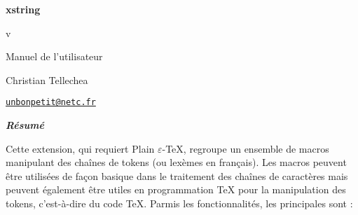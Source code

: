 \documentclass[a4paper,10pt,french]{article}
\newcommand\Xstring{\textsf{xstring}\xspace}
\def\xstringfrenchdateaux#1/#2/#3\nil{\number#3\relax\ifnum#3=1 \noexpand\ier\fi\space \ifcase #2 \or janvier\or f\'evrier\or mars\or avril\or mai\or juin\or juillet\or aout\or septembre\or octobre\or novembre\or d\'ecembre\fi\space#1}
\edef\xstringfrenchdate{\expandafter\xstringfrenchdateaux\xstringdate\nil}
\begin{document}
\setlength{\parindent}{0pt}
\begin{titlepage}
	\null\par\vfill
	\begin{center}
		\begin{minipage}{0.75\linewidth}
			\begin{center}
				\Huge\bfseries \Xstring\par\vspace{5pt}
				\small v\xstringversion\par\vspace{25pt}
				\normalsize Manuel de l'utilisateur
			\end{center}
		\end{minipage}
	\end{center}
	\vspace{1cm}
	\begin{center}
		Christian {\sc Tellechea}\par\small
		\href{mailto:unbonpetit@netc.fr}{\nolinkurl{unbonpetit@netc.fr}}\par\vspace{5pt}
		\xstringfrenchdate
	\end{center}
	\vfill\hrulefill
	\begin{center}
		\begin{minipage}{0.85\linewidth}
			\noindent
			\hfill\textbf{\textit{Résumé}}\hfill{}\medskip\par
			Cette extension, qui requiert Plain $\varepsilon$-\TeX, regroupe un ensemble de macros manipulant des chaînes de tokens (ou lexèmes en français). Les macros peuvent être utilisées de façon basique dans le traitement des chaînes de caractères mais peuvent également être utiles en programmation \TeX{} pour la manipulation des tokens, c'est-à-dire du code \TeX{}. Parmis les fonctionnalités, les principales sont :\smallskip


\end{minipage}
\end{center}
\end{titlepage}
\end{document}
